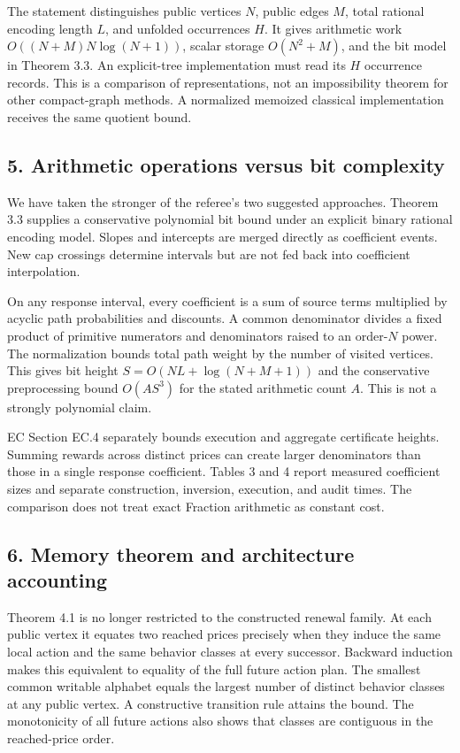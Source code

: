 \documentclass[
  11pt,
]{article}
\begin{document}
The statement distinguishes public vertices \(N\), public edges \(M\),
total rational encoding length \(L\), and unfolded occurrences \(H\). It
gives arithmetic work \(O((N+M)N\log(N+1))\), scalar storage
\(O(N^2+M)\), and the bit model in Theorem 3.3. An explicit-tree
implementation must read its \(H\) occurrence records. This is a
comparison of representations, not an impossibility theorem for other
compact-graph methods. A normalized memoized classical implementation
receives the same quotient bound.

\subsection{5. Arithmetic operations versus bit
complexity}\label{arithmetic-operations-versus-bit-complexity}

We have taken the stronger of the referee's two suggested approaches.
Theorem 3.3 supplies a conservative polynomial bit bound under an
explicit binary rational encoding model. Slopes and intercepts are
merged directly as coefficient events. New cap crossings determine
intervals but are not fed back into coefficient interpolation.

On any response interval, every coefficient is a sum of source terms
multiplied by acyclic path probabilities and discounts. A common
denominator divides a fixed product of primitive numerators and
denominators raised to an order-\(N\) power. The normalization bounds
total path weight by the number of visited vertices. This gives bit
height \(S=O(NL+\log(N+M+1))\) and the conservative preprocessing bound
\(O(AS^3)\) for the stated arithmetic count \(A\). This is not a
strongly polynomial claim.

EC Section EC.4 separately bounds execution and aggregate certificate
heights. Summing rewards across distinct prices can create larger
denominators than those in a single response coefficient. Tables 3 and 4
report measured coefficient sizes and separate construction, inversion,
execution, and audit times. The comparison does not treat exact Fraction
arithmetic as constant cost.

\subsection{6. Memory theorem and architecture
accounting}\label{memory-theorem-and-architecture-accounting}

Theorem 4.1 is no longer restricted to the constructed renewal family.
At each public vertex it equates two reached prices precisely when they
induce the same local action and the same behavior classes at every
successor. Backward induction makes this equivalent to equality of the
full future action plan. The smallest common writable alphabet equals
the largest number of distinct behavior classes at any public vertex. A
constructive transition rule attains the bound. The monotonicity of all
future actions also shows that classes are contiguous in the
reached-price order.
\end{document}
